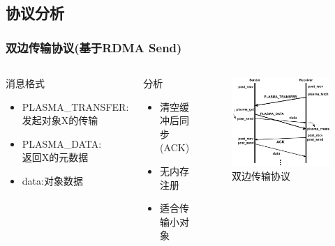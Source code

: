 \subsection*{协议分析}
\begin{frame}
	\frametitle{双边传输协议(基于RDMA Send)}
	\begin{columns}[onlytextwidth]
		\begin{block}{消息格式}
			\begin{itemize}
				\item PLASMA\_TRANSFER:\\发起对象X的传输
				\item PLASMA\_DATA:\\返回X的元数据
				\item data:对象数据
			\end{itemize}
		\end{block}
		\begin{block}{分析}
			\begin{itemize}
				\item 清空缓冲后同步(ACK)
				\item 无内存注册
				\item 适合传输小对象
			\end{itemize}
		\end{block}
		\begin{figure}
			\centering
			\includegraphics[width=\textwidth]{image/chap03/send_protocol.png}
			\caption{双边传输协议}
		\end{figure}
	\end{columns}
\end{frame}

